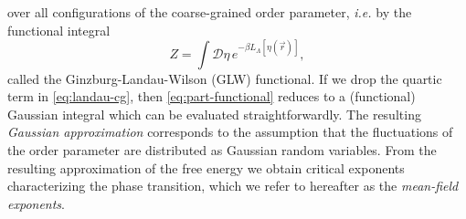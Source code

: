 over all configurations of the coarse-grained order parameter, \textit{i.e.} by
the functional integral
\begin{equation}
  Z = \int\mathcal{D}\eta \, e^{-\beta L_{\Lambda}[\eta(\vec{r})]},
  \label{eq:part-functional}
\end{equation}
called the Ginzburg-Landau-Wilson (GLW) functional. If we drop the quartic term
in \cref{eq:landau-cg}, then \cref{eq:part-functional} reduces to a
(functional) Gaussian integral which can be evaluated straightforwardly. The
resulting \emph{Gaussian approximation} corresponds to the assumption that the
fluctuations of the order parameter are distributed as Gaussian random
variables. From the resulting approximation of the free energy we obtain
critical exponents characterizing the phase transition, which we refer to
hereafter as the \emph{mean-field exponents}.

